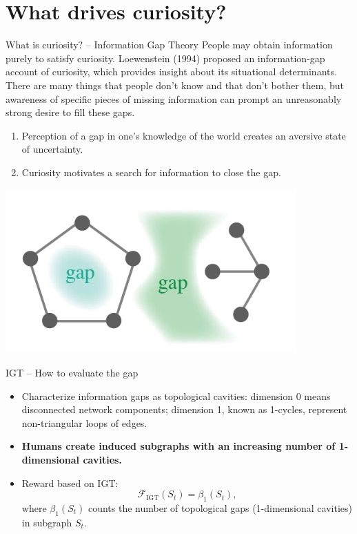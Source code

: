 \documentclass{beamer}
\begin{document}
\section{What drives curiosity?}
\begin{frame}{What is curiosity? -- Information Gap Theory}
People may obtain information purely to satisfy curiosity. Loewenstein (1994) proposed an information-gap account of curiosity, which provides insight about its situational determinants.\\
There are many things that people don’t know and that don’t bother them, but awareness of specific pieces of missing information can prompt an unreasonably strong desire to fill these gaps.
\begin{enumerate}
	\item Perception of a gap in one’s knowledge of the world creates an aversive state of uncertainty.
	\item Curiosity motivates a search for information to close the gap.
\end{enumerate}
\begin{center} \includegraphics[scale=.4]{IGT.jpg}\end{center}
\end{frame}


\begin{frame}{IGT -- How to evaluate the gap}
	\begin{itemize}
	\item Characterize information gaps as topological cavities: dimension 0 means disconnected network components; dimension 1, known as 1-cycles, represent non-triangular loops of edges.
	\item \textbf{Humans create induced subgraphs with an increasing number of 1-dimensional cavities.}
	\item Reward based on IGT:
	\begin{equation}
    \mathcal{F}_{\text{IGT}}(S_t) = \beta_1(S_t),
    \end{equation}
    where $\beta_1(S_t)$ counts the number of topological gaps (1-dimensional cavities) in subgraph $S_t$.
    
	\end{itemize}
\end{frame}
\end{document}
